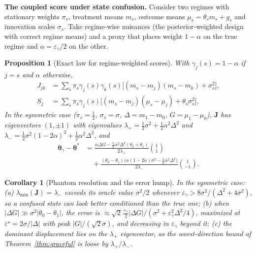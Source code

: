 \documentclass[twoside]{article}
\newtheorem{proposition}{Proposition}
\newtheorem{corollary}{Corollary}
\theoremstyle{definition}
\newcommand{\bJ}{\boldsymbol{J}}
\newcommand{\bth}{\boldsymbol{\theta}}
\newcommand{\eps}{\varepsilon_\gamma}
\newcommand{\lmin}{\lambda_{\min}}
\begin{document}
\textbf{The coupled score under state confusion.} Consider two regimes with stationary weights $\pi_s$, treatment means $m_s$, outcome means $\mu_s=\theta_sm_s+g_s$ and innovation scales $\sigma_s$. Take regime-wise nuisances (the posterior-weighted design with correct regime means) and a proxy that places weight $1-\alpha$ on the true regime and $\alpha=\eps/2$ on the other.

\begin{proposition}[Exact law for regime-weighted scores]
\label{prop:exact}
With $\gamma_j(s)=1-\alpha$ if $j=s$ and $\alpha$ otherwise,
\begin{align*}
J_{jk}&=\textstyle\sum_s\pi_s\gamma_j(s)\gamma_k(s)\big[(m_s{-}m_j)(m_s{-}m_k)+\sigma_s^2\big],\\
S_j&=\textstyle\sum_s\pi_s\gamma_j(s)\big[(m_s{-}m_j)(\mu_s{-}\mu_j)+\theta_s\sigma_s^2\big].
\end{align*}
In the symmetric case ($\pi_s=\tfrac12$, $\sigma_s=\sigma$, $\Delta=m_1-m_0$, $G=\mu_1-\mu_0$), $\bJ$ has eigenvectors $(1,\pm1)$ with eigenvalues $\lambda_+=\tfrac12\sigma^2+\tfrac12\alpha^2\Delta^2$ and $\lambda_-=\tfrac12\sigma^2(1-2\alpha)^2+\tfrac12\alpha^2\Delta^2$, and
\begin{align*}
\bth_\gamma-\bth^*&=\frac{\alpha\Delta G-\tfrac12\alpha^2\Delta^2(\theta_0{+}\theta_1)}{2\lambda_+}\binom{1}{1}\\
&\quad+\frac{(\theta_0{-}\theta_1)\big(\alpha(1{-}2\alpha)\sigma^2-\tfrac12\alpha^2\Delta^2\big)}{2\lambda_-}\binom{1}{-1}.
\end{align*}
\end{proposition}
\begin{corollary}[Phantom resolution and the error hump]
\label{cor:phantom}
In the symmetric case: (a) $\lmin(\bJ)=\lambda_-$ exceeds its oracle value $\sigma^2/2$ whenever $\eps>8\sigma^2/(\Delta^2+4\sigma^2)$, so a confused state can look \emph{better} conditioned than the true one; (b) when $|\Delta G|\gg\sigma^2|\theta_0-\theta_1|$, the error is $\approx\sqrt2\,\tfrac{\eps}{2}|\Delta G|/(\sigma^2+\eps^2\Delta^2/4)$, maximized at $\varepsilon^\star=2\sigma/|\Delta|$ with peak $|G|/(\sqrt2\sigma)$, and \emph{decreasing} in $\eps$ beyond it; (c) the dominant displacement lies on the $\lambda_+$ eigenvector, so the worst-direction bound of Theorem~\ref{thm:graceful} is loose by $\lambda_+/\lambda_-$.
\end{corollary}
\end{document}
